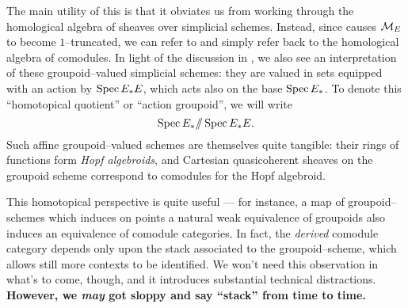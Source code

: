 \begin{remark}\label{FHGivesComodules}
The main utility of this is that it obviates us from working through the homological algebra of sheaves over simplicial schemes.  Instead, since {\FH} causes $\mathcal{M}_{E}$ to become $1$--truncated, we can refer to  and simply refer back to the homological algebra of comodules.  In light of the discussion in , we also see an interpretation of these groupoid--valued simplicial schemes: they are valued in sets equipped with an action by $\operatorname{Spec} E_* E$, which acts also on the base $\operatorname{Spec} E_*$.  To denote this ``homotopical quotient'' or ``action groupoid'', we will write \[\operatorname{Spec} E_* /\!\!/ \operatorname{Spec} E_* E.\]  Such affine groupoid--valued schemes are themselves quite tangible: their rings of functions form \textit{Hopf algebroids}, and Cartesian quasicoherent sheaves on the groupoid scheme correspond to comodules for the Hopf algebroid.
\end{remark}


\begin{remark}
This homotopical perspective is quite useful --- for instance, a map of groupoid--schemes which induces on points a natural weak equivalence of groupoids also induces an equivalence of comodule categories.  In fact, the \emph{derived} comodule category depends only upon the stack associated to the groupoid--scheme, which allows still more contexts to be identified.  We won't need this observation in what's to come, though, and it introduces substantial technical distractions.  \textbf{However, we \emph{may} got sloppy and say ``stack'' from time to time.}
\end{remark}


